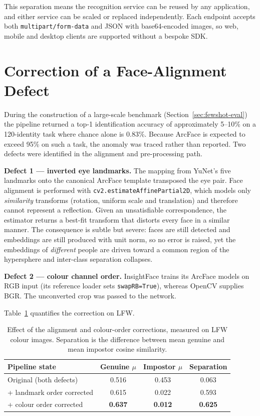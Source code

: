 \documentclass[12pt,a4paper]{report}
\begin{document}
This separation means the recognition service can be reused by any application,
and either service can be scaled or replaced independently. Each endpoint accepts
both \texttt{multipart/form-data} and JSON with base64-encoded images, so web,
mobile and desktop clients are supported without a bespoke SDK.

\section{Correction of a Face-Alignment Defect}
\label{sec:alignment-defect}

During the construction of a large-scale benchmark (Section~\ref{sec:fewshot-eval})
the pipeline returned a top-1 identification accuracy of approximately 5--10\% on
a 120-identity task where chance alone is 0.83\%. Because ArcFace is expected to
exceed 95\% on such a task, the anomaly was traced rather than reported. Two
defects were identified in the alignment and pre-processing path.

\textbf{Defect 1 --- inverted eye landmarks.} The mapping from YuNet's five
landmarks onto the canonical ArcFace template transposed the eye pair. Face
alignment is performed with \texttt{cv2.estimateAffinePartial2D}, which models
only \emph{similarity} transforms (rotation, uniform scale and translation) and
therefore cannot represent a reflection. Given an unsatisfiable correspondence,
the estimator returns a best-fit transform that distorts every face in a similar
manner. The consequence is subtle but severe: faces are still detected and
embeddings are still produced with unit norm, so no error is raised, yet the
embeddings of \emph{different} people are driven toward a common region of the
hypersphere and inter-class separation collapses.

\textbf{Defect 2 --- colour channel order.} InsightFace trains its ArcFace models
on RGB input (its reference loader sets \texttt{swapRB=True}), whereas OpenCV
supplies BGR. The unconverted crop was passed to the network.

Table~\ref{tab:alignment-fix} quantifies the correction on LFW.

\begin{table}[H]
  \centering
  \caption{Effect of the alignment and colour-order corrections, measured on LFW
  colour images. Separation is the difference between mean genuine and mean
  impostor cosine similarity.}
  \label{tab:alignment-fix}
  \begin{tabular}{lccc}
    \toprule
    \textbf{Pipeline state} & \textbf{Genuine $\mu$} & \textbf{Impostor $\mu$} & \textbf{Separation} \\
    \midrule
    Original (both defects)      & 0.516 & 0.453 & 0.063 \\
    + landmark order corrected   & 0.615 & 0.022 & 0.593 \\
    + colour order corrected     & \textbf{0.637} & \textbf{0.012} & \textbf{0.625} \\
    \bottomrule
  \end{tabular}
\end{table}
\end{document}
